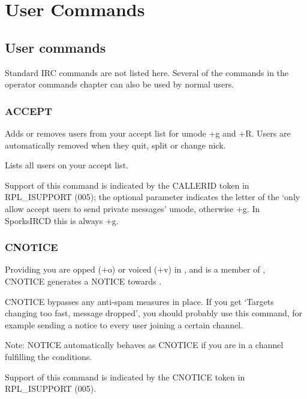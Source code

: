 \chapter{User Commands}
\label{ucommands}

\section{User commands}
	Standard IRC commands are not listed here. Several of the commands in
	the operator commands chapter can also be used by normal users.

\subsection{ACCEPT}

 \literal{,-{}}\literal{,} 
	Adds or removes users from your accept list for umode +g and +R. Users
	are automatically removed when they quit, split or change nick.

	\literal{*}

	Lists all users on your accept list.

	Support of this command is indicated by the CALLERID token in
	RPL\_ISUPPORT (005); the optional parameter indicates the letter of the
	`only allow accept users to send private messages' umode, otherwise +g.
	In SporksIRCD this is always +g.

\subsection{CNOTICE}

   \literal{:}

	Providing you are opped (+o) or voiced (+v) in ,
	and  is a member of , CNOTICE
	generates a NOTICE towards .

	CNOTICE bypasses any anti-{}spam measures in place. If you get `Targets
	changing too fast, message dropped', you should probably use this
	command, for example sending a notice to every user joining a certain
	channel.

	Note: NOTICE automatically behaves as CNOTICE if you are in a channel
	fulfilling the conditions.

	Support of this command is indicated by the CNOTICE token in
	RPL\_ISUPPORT (005).

